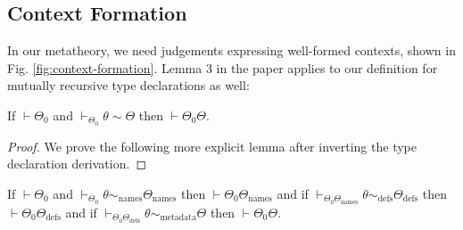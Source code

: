 \subsection{Context Formation}
In our metatheory, we need judgements expressing well-formed contexts, shown in Fig. \ref{fig:context-formation}. Lemma 3 in the paper applies to our definition for mutually recursive type declarations as well:
\begin{lemma}
If $\vdash \Theta_0$ and $\vdash_{\Theta_0} \theta \sim \Theta$ then $\vdash \Theta_{0}\Theta$.
\end{lemma}
\begin{proof}
We prove the following more explicit lemma after inverting the type declaration derivation.
\end{proof}
\begin{lemma}
If $\vdash \Theta_0$ and $\vdash_{\Theta_0} \theta \sim_{\text{names}} \Theta_{\text{names}}$ then $\vdash\Theta_0\Theta_{\text{names}}$ and if $\vdash_{\Theta_0\Theta_{\text{names}}} \theta \sim_{\text{defs}} \Theta_{\text{defs}}$ then $\vdash \Theta_0\Theta_{\text{defs}} $ and if $\vdash_{\Theta_0\Theta_{\text{defs}}} \theta \sim_{\text{metadata}} \Theta$ then $\vdash \Theta_0\Theta$.
\end{lemma}
